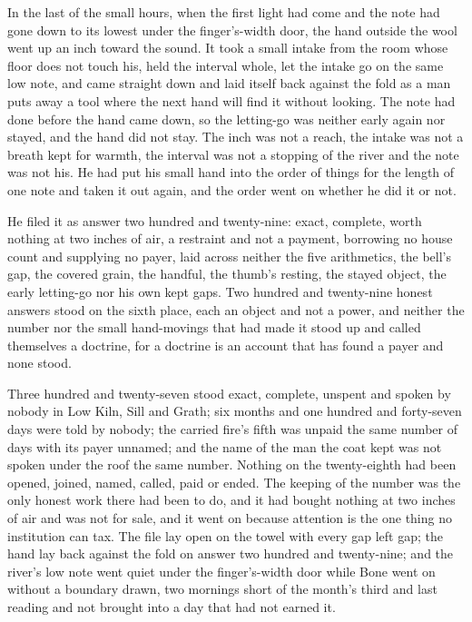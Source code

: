 In the last of the small hours, when the first light had come and the note had gone down to its lowest under the finger's-width door, the hand outside the wool went up an inch toward the sound. It took a small intake from the room whose floor does not touch his, held the interval whole, let the intake go on the same low note, and came straight down and laid itself back against the fold as a man puts away a tool where the next hand will find it without looking. The note had done before the hand came down, so the letting-go was neither early again nor stayed, and the hand did not stay. The inch was not a reach, the intake was not a breath kept for warmth, the interval was not a stopping of the river and the note was not his. He had put his small hand into the order of things for the length of one note and taken it out again, and the order went on whether he did it or not.

He filed it as answer two hundred and twenty-nine: exact, complete, worth nothing at two inches of air, a restraint and not a payment, borrowing no house count and supplying no payer, laid across neither the five arithmetics, the bell's gap, the covered grain, the handful, the thumb's resting, the stayed object, the early letting-go nor his own kept gaps. Two hundred and twenty-nine honest answers stood on the sixth place, each an object and not a power, and neither the number nor the small hand-movings that had made it stood up and called themselves a doctrine, for a doctrine is an account that has found a payer and none stood.

Three hundred and twenty-seven stood exact, complete, unspent and spoken by nobody in Low Kiln, Sill and Grath; six months and one hundred and forty-seven days were told by nobody; the carried fire's fifth was unpaid the same number of days with its payer unnamed; and the name of the man the coat kept was not spoken under the roof the same number. Nothing on the twenty-eighth had been opened, joined, named, called, paid or ended. The keeping of the number was the only honest work there had been to do, and it had bought nothing at two inches of air and was not for sale, and it went on because attention is the one thing no institution can tax. The file lay open on the towel with every gap left gap; the hand lay back against the fold on answer two hundred and twenty-nine; and the river's low note went quiet under the finger's-width door while Bone went on without a boundary drawn, two mornings short of the month's third and last reading and not brought into a day that had not earned it.
